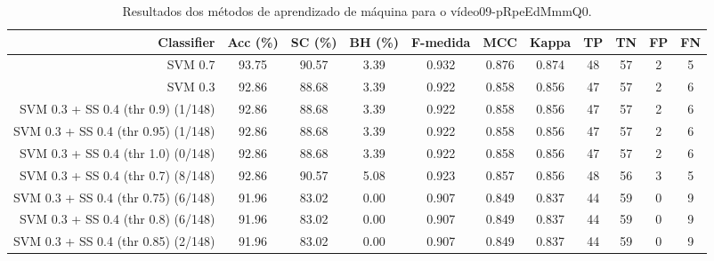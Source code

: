 \begin{table}[!htb]
\centering
\caption{Resultados dos métodos de aprendizado de máquina para o vídeo09-pRpeEdMmmQ0.}
\label{tab:09-pRpeEdMmmQ0}
\begin{tabular}{r|c|c|c|c|c|c|c|c|c|c}
\hline\hline
Classifier & Acc (\%) & SC (\%) & BH (\%) & F-medida & MCC & Kappa & TP & TN & FP & FN \\ \hline
SVM 0.7 & 93.75 & 90.57 & 3.39 & 0.932 & 0.876 & 0.874 & 48 & 57 & 2 & 5 \\ 
SVM 0.3 & 92.86 & 88.68 & 3.39 & 0.922 & 0.858 & 0.856 & 47 & 57 & 2 & 6 \\ 
SVM 0.3 + SS 0.4 (thr 0.9) (1/148) & 92.86 & 88.68 & 3.39 & 0.922 & 0.858 & 0.856 & 47 & 57 & 2 & 6 \\ 
SVM 0.3 + SS 0.4 (thr 0.95) (1/148) & 92.86 & 88.68 & 3.39 & 0.922 & 0.858 & 0.856 & 47 & 57 & 2 & 6 \\ 
SVM 0.3 + SS 0.4 (thr 1.0) (0/148) & 92.86 & 88.68 & 3.39 & 0.922 & 0.858 & 0.856 & 47 & 57 & 2 & 6 \\ 
SVM 0.3 + SS 0.4 (thr 0.7) (8/148) & 92.86 & 90.57 & 5.08 & 0.923 & 0.857 & 0.856 & 48 & 56 & 3 & 5 \\ 
SVM 0.3 + SS 0.4 (thr 0.75) (6/148) & 91.96 & 83.02 & 0.00 & 0.907 & 0.849 & 0.837 & 44 & 59 & 0 & 9 \\ 
SVM 0.3 + SS 0.4 (thr 0.8) (6/148) & 91.96 & 83.02 & 0.00 & 0.907 & 0.849 & 0.837 & 44 & 59 & 0 & 9 \\ 
SVM 0.3 + SS 0.4 (thr 0.85) (2/148) & 91.96 & 83.02 & 0.00 & 0.907 & 0.849 & 0.837 & 44 & 59 & 0 & 9 \\ 
\hline\hline
\end{tabular}
\end{table}
